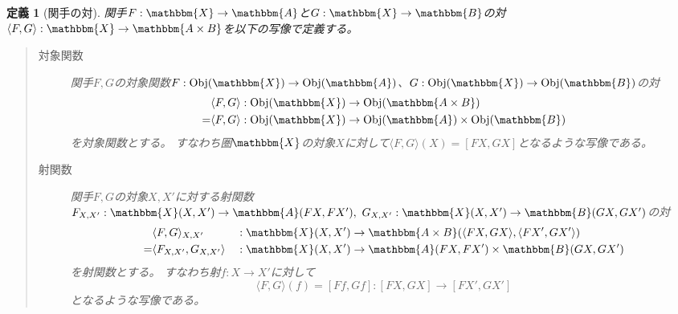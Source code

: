\documentclass[uplatex,dvipdfmx]{jsarticle}
\newcommand{\cat}[1]{\mathbbm{#1}}
\newcommand{\arrow}{\rightarrow}
\newcommand{\functor}[3]{#1:\cat{#2}\arrow \cat{#3}}
\newcommand{\tuple}[1]{\langle #1\rangle}
\newcommand{\obj}[1]{\mathrm{Obj}(\cat{#1})}
\newcommand{\mor}[3]{#1:#2\arrow #3}
\newcommand{\arset}[3]{\cat{#1}(#2,#3)}
\newcommand{\pcobj}[1]{[#1]}
\newtheorem{define}{定義}[section]
\numberwithin{proof}{subsection}
\numberwithin{prop}{subsection}
\numberwithin{define}{subsection}
\begin{document}
	\begin{define}[関手の対]
		関手$\functor{F}{X}{A}$と$\functor{G}{X}{B}$の対$\functor{\tuple{F,G}}{X}{A\times B}$を以下の写像で定義する。
		\begin{quote}
			\begin{description}
				\item[対象関数] 関手$F,G$の対象関数$\mor{F}{\obj{X}}{\obj{A}}$、$\mor{G}{\obj{X}}{\obj{B}}$の対
				\begin{align*}
					&\mor{\tuple{F,G}}{\obj{X}}{\obj{A\times B}}\\
					=&\mor{\tuple{F,G}}{\obj{X}}{\obj{A}\times \obj{B}}
				\end{align*}
				を対象関数とする。
				すなわち圏$\cat{X}$の対象$X$に対して$\tuple{F,G}(X)=\pcobj{FX,GX}$となるような写像である。
				\item[射関数]
				関手$F,G$の対象$X,X'$に対する射関数$\mor{F_{X,X'}}{\arset{X}{X}{X'}}{\arset{A}{FX}{FX'}},\ \mor{G_{X,X'}}{\arset{X}{X}{X'}}{\arset{B}{GX}{GX'}}$の対
				\begin{align*}
					&\mor{\tuple{F,G}_{X,X'}&&}{\arset{X}{X}{X'}}{\arset{A\times B}{\tuple{FX,GX}}{\tuple{FX',GX'}}}\\
					=&	\mor{\tuple{F_{X,X'},G_{X,X'}}&&}{\arset{X}{X}{X'}}{\arset{A}{FX}{FX'}\times\arset{B}{GX}{GX'}}
				\end{align*}
				を射関数とする。
				すなわち射$\mor{f}{X}{X'}$に対して\[\mor{\tuple{F,G}(f)=\pcobj{Ff,Gf}}{\pcobj{FX,GX}}{\pcobj{FX',GX'}}\]となるような写像である。


\end{description}
\end{quote}
\end{define}
\end{document}

